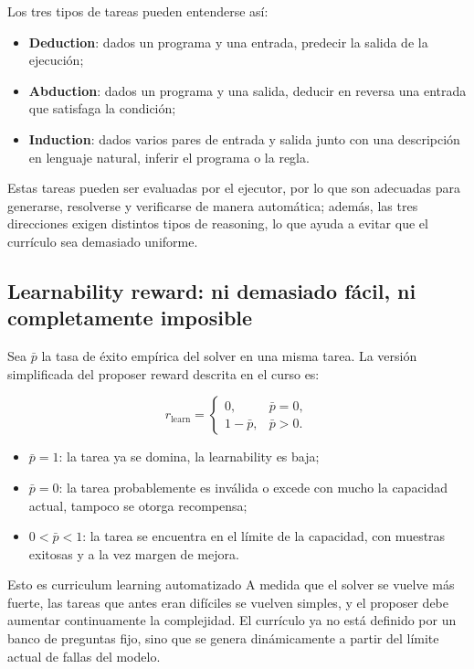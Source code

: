 
Los tres tipos de tareas pueden entenderse así:

\begin{itemize}
    \item \textbf{Deduction}: dados un programa y una entrada, predecir la salida de la ejecución;
    \item \textbf{Abduction}: dados un programa y una salida, deducir en reversa una entrada que satisfaga la condición;
    \item \textbf{Induction}: dados varios pares de entrada y salida junto con una descripción en lenguaje natural, inferir el programa o la regla.
\end{itemize}

Estas tareas pueden ser evaluadas por el ejecutor, por lo que son adecuadas para generarse, resolverse y verificarse de manera automática; además, las tres direcciones exigen distintos tipos de reasoning, lo que ayuda a evitar que el currículo sea demasiado uniforme.

\subsection{Learnability reward: ni demasiado fácil, ni completamente imposible}

Sea $\bar p$ la tasa de éxito empírica del solver en una misma tarea. La versión simplificada del proposer reward descrita en el curso es:

$$
r_{\mathrm{learn}}=
\begin{cases}
0, & \bar p=0,\\
1-\bar p, & \bar p>0.
\end{cases}
$$

\begin{itemize}
    \item $\bar p=1$: la tarea ya se domina, la learnability es baja;
    \item $\bar p=0$: la tarea probablemente es inválida o excede con mucho la capacidad actual, tampoco se otorga recompensa;
    \item $0<\bar p<1$: la tarea se encuentra en el límite de la capacidad, con muestras exitosas y a la vez margen de mejora.
\end{itemize}

\begin{knowledgebox}{Esto es curriculum learning automatizado}
A medida que el solver se vuelve más fuerte, las tareas que antes eran difíciles se vuelven simples, y el proposer debe aumentar continuamente la complejidad. El currículo ya no está definido por un banco de preguntas fijo, sino que se genera dinámicamente a partir del límite actual de fallas del modelo.
\end{knowledgebox}


